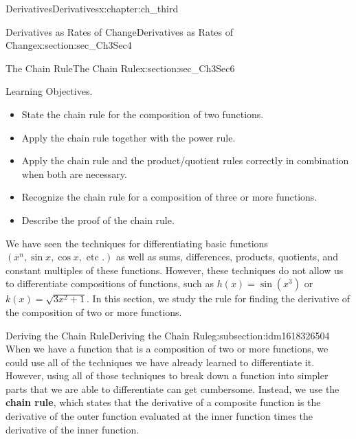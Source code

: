 \documentclass[oneside,10pt,]{book}
\newcommand{\terminology}[1]{\textbf{#1}}
\numberwithin{equation}{section}
\begin{document}
\begin{chapterptx}{Derivatives}{}{Derivatives}{}{}{x:chapter:ch_third}
\begin{sectionptx}{Derivatives as Rates of Change}{}{Derivatives as Rates of Change}{}{}{x:section:sec_Ch3Sec4}
\end{sectionptx}
%
%
\typeout{************************************************}
\typeout{************************************************}
%
\begin{sectionptx}{The Chain Rule}{}{The Chain Rule}{}{}{x:section:sec_Ch3Sec6}
\begin{introduction}{Learning Objectives.}%
%
\begin{itemize}[label=\textbullet]
\item{}State the chain rule for the composition of two functions.%
\item{}Apply the chain rule together with the power rule.%
\item{}Apply the chain rule and the product\slash{}quotient rules correctly in combination when both are necessary.%
\item{}Recognize the chain rule for a composition of three or more functions.%
\item{}Describe the proof of the chain rule.%
\end{itemize}
We have seen the techniques for differentiating basic functions \((x^n,\sin x,\cos x,\text{ etc }.)\) as well as sums, differences, products, quotients, and constant multiples of these functions. However, these techniques do not allow us to differentiate compositions of functions, such as \(h(x)=\sin(x^3)\) or \(k(x)=\sqrt{3x^2+1}.\) In this section, we study the rule for finding the derivative of the composition of two or more functions.%
\end{introduction}%
%
%
\typeout{************************************************}
\typeout{************************************************}
%
\begin{subsectionptx}{Deriving the Chain Rule}{}{Deriving the Chain Rule}{}{}{g:subsection:idm1618326504}
When we have a function that is a composition of two or more functions, we could use all of the techniques we have already learned to differentiate it. However, using all of those techniques to break down a function into simpler parts that we are able to differentiate can get cumbersome. Instead, we use the \terminology{chain rule}, which states that the derivative of a composite function is the derivative of the outer function evaluated at the inner function times the derivative of the inner function.%
\par

\end{subsectionptx}
\end{sectionptx}
\end{chapterptx}
\end{document}
